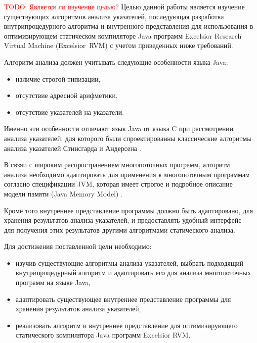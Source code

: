 \documentclass[14pt,titlepage]{extarticle}
\newcommand{\todo}[1]{\textcolor{red}{TODO: #1}}
\newcommand{\eng}[1]{{\English#1}}
\begin{document}
    \todo{Является ли изучение целью?}
    Целью данной работы является изучение существующих алгоритмов анализа
    указателей, последующая разработка внутрипроцедурного алгоритма и
    внутренного представления для использования в оптимизирующем
    статическом компиляторе Java программ
    \eng{Excelsior Research Virtual Machine (Excelsior~RVM)}
    \cite{excelsior_jet} с учетом приведенных ниже требований.

    Алгоритм анализа должен учитывать следующие особенности языка Java:
    \begin{itemize}
      \item наличие строгой типизации,
      \item отсутствие адресной арифметики,
      \item отсутствие указателей на указатели.
    \end{itemize}
    Именно эти особенности отличают язык Java от языка C при рассмотрении
    анализа указателей, для которого были
    спроектированны классические алгоритмы анализа указателей
    Стинсгарда \cite{steensgaard} и Андерсена \cite{andersen}.

    В свзяи с широким распространением многопоточных программ,
    алгоритм анализа необходимо адаптировать для применения к
    многопоточным программам согласно спецификации JVM, которая имеет
    строгое и подробное описание модели памяти (Java Memory Model)
    \cite{manson_jmm}.

    Кроме того внутреннее представление программы должно быть адаптировано,
    для хранения результатов анализа указателей, и предоставлять удобный
    интерфейс для получения этих результатов другими алгоритмами статического
    анализа.

    Для достижения поставленной цели необходимо:
    \begin{itemize}
      \item изучив существующие алгоритмы анализа указателей, выбрать
            подходящий внутрипроцедурный алгоритм и адаптировать его
            для анализа многопоточных программ на языке Java,
      \item адаптировать существующее внутреннее представление программы для
            хранения результатов анализа указателей,
      \item реализовать алгоритм и внутреннее представление для оптимизирующего
            статического компилятора Java программ \eng{Excelsior RVM}.
    \end{itemize}

\end{document}
